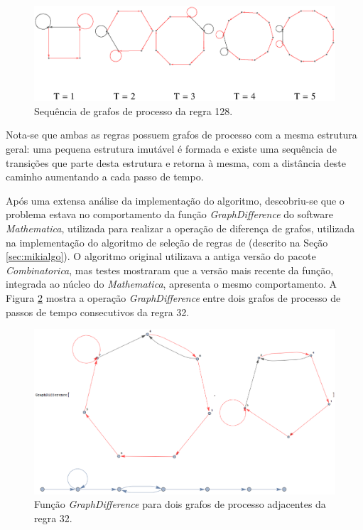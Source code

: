 \documentclass[12pt,a4paper]{article}
\begin{document}
\begin{figure}[htp]
\begin{center}
\includegraphics[scale=0.70]{img/Rule128.eps}
\caption{Sequência de grafos de processo da regra 128.}
\label{fig:r128t}
\end{center}
\end{figure}

Nota-se que ambas as regras possuem grafos de processo com a mesma estrutura geral:
uma pequena estrutura imutável é formada e existe
uma sequência de transições que parte desta estrutura e retorna à mesma, com
a distância deste caminho aumentando a cada passo de tempo.

Após uma extensa análise da implementação do algoritmo, descobriu-se que o
problema estava no comportamento da função \textit{GraphDifference} do
software \textit{Mathematica}, utilizada para realizar a operação de
diferença de grafos, utilizada na implementação do algoritmo de seleção de regras de
 (descrito na Seção \ref{sec:mikialgo}).
O algoritmo original utilizava a antiga versão do pacote
\textit{Combinatorica}, mas testes mostraram que a versão mais recente da
função, integrada ao núcleo do \textit{Mathematica}, apresenta o mesmo
comportamento. A Figura \ref{fig:gd1} mostra a operação
\textit{GraphDifference} entre dois grafos de processo de passos de tempo
consecutivos da regra 32.

\begin{figure}[htp]
\begin{center}
\includegraphics[scale=0.33]{img/GraphDifference1.eps}
\caption{Função \textit{GraphDifference} para dois grafos de processo
adjacentes da regra 32.}
\label{fig:gd1}
\end{center}
\end{figure}
\end{document}
